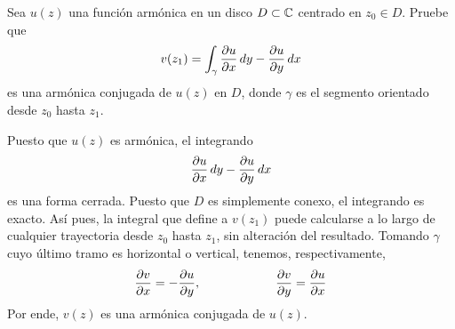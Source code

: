 \begin{exercise}
Sea $u(z)$ una función armónica en un disco $D \subset \mathbb C$ centrado en $z_0 \in D$. Pruebe que
$$v(z_1) = \int_{\gamma} \dfrac {\partial u} {\partial x} \, dy - \dfrac {\partial u} {\partial y} \, dx$$
es una armónica conjugada de $u(z)$ en $D$, donde $\gamma$ es el segmento orientado desde $z_0$ hasta $z_1$.
\end{exercise}

\begin{solution}
Puesto que $u(z)$ es armónica, el integrando
$$\dfrac {\partial u} {\partial x} \, dy - \dfrac {\partial u} {\partial y} \, dx$$
es una forma cerrada. Puesto que $D$ es simplemente conexo, el integrando es exacto. Así pues, la integral que define a $v(z_1)$ puede calcularse a lo largo de cualquier trayectoria desde $z_0$ hasta $z_1$, sin alteración del resultado. Tomando $\gamma$ cuyo último tramo es horizontal o vertical, tenemos, respectivamente,
$$\dfrac {\partial v} {\partial x} = -\dfrac {\partial u} {\partial y}, \qquad \qquad \qquad \dfrac {\partial v} {\partial y} = \dfrac {\partial u} {\partial x}$$
Por ende, $v(z)$ es una armónica conjugada de $u(z)$.
\end{solution}
